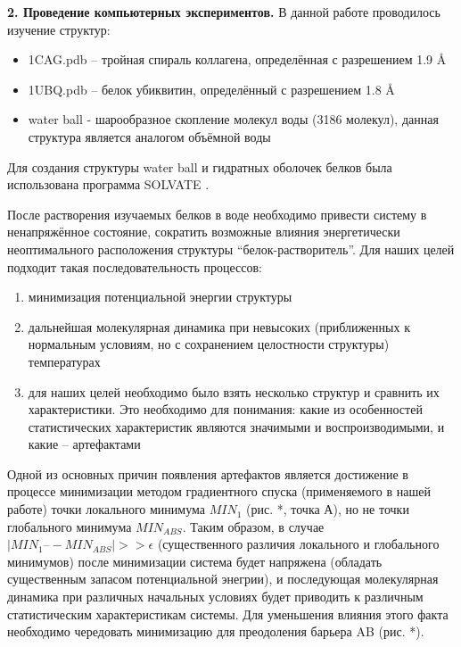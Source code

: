 \documentclass[a4paper]{article}
\begin{document}
\textbf{2. Проведение компьютерных экспериментов.} В данной работе проводилось изучение структур:
\begin{itemize}
\item 1CAG.pdb – тройная спираль коллагена, определённая с разрешением 1.9 \AA 
\item 1UBQ.pdb – белок убиквитин, определённый с разрешением 1.8 \AA
\item water ball -  шарообразное скопление молекул воды (3186 молекул), данная структура является аналогом объёмной воды
\end{itemize}

Для создания структуры water ball и гидратных оболочек белков была
использована программа SOLVATE \cite{solvate}.

После растворения изучаемых белков в воде необходимо привести систему в ненапряжённое состояние, сократить возможные влияния энергетически неоптимального расположения структуры “белок-растворитель”.  Для наших целей подходит такая последовательность процессов: 
\begin{enumerate}
\item минимизация потенциальной энергии структуры
\item дальнейшая молекулярная динамика при невысоких (приближенных к нормальным условиям, но с сохранением целостности структуры) температурах
\item для наших целей необходимо было взять несколько структур и сравнить их характеристики. Это необходимо для понимания: какие из особенностей статистических характеристик являются значимыми и воспроизводимыми, и какие – артефактами
\end{enumerate}

Одной из основных причин появления артефактов является достижение в процессе
минимизации методом градиентного спуска (применяемого в нашей работе) точки локального минимума $MIN_1$ (рис. *, точка А), но не точки глобального минимума $MIN_{ABS}$. Таким образом, в случае $| MIN_1 –- MIN_{ABS} | >> \epsilon$ (существенного различия локального и глобального минимумов) после минимизации система будет напряжена (обладать существенным запасом потенциальной энегрии), и последующая молекулярная динамика при различных начальных условиях будет приводить к различным статистическим характеристикам системы. Для уменьшения влияния этого факта необходимо чередовать минимизацию для преодоления барьера AB (рис. *).          
\end{document}
